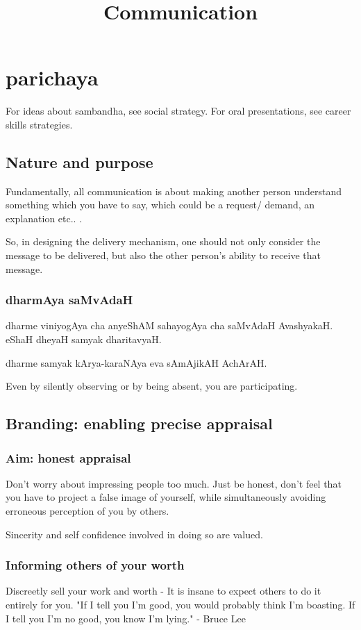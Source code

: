 \documentclass[oneside, article]{memoir}
\title{Communication}
\author{}
\begin{document}
\maketitle

\part{parichaya}
For ideas about sambandha, see social strategy. For oral presentations, see career skills strategies.

\chapter{Nature and purpose}
Fundamentally, all communication is about making another person understand something which you have to say, which could be a request/ demand, an explanation etc.. .

So, in designing the delivery mechanism, one should not only consider the message to be delivered, but also the other person’s ability to receive that message.

\section{dharmAya saMvAdaH}
dharme viniyogAya cha anyeShAM sahayogAya cha saMvAdaH AvashyakaH. eShaH dheyaH samyak dharitavyaH.

dharme samyak kArya-karaNAya eva sAmAjikAH AchArAH.

Even by silently observing or by being absent, you are participating.

\chapter{Branding: enabling precise appraisal}
\section{Aim: honest appraisal}
Don't worry about impressing people too much. Just be honest, don't feel that you have to project a false image of yourself, while simultaneously avoiding erroneous perception of you by others.

Sincerity and self confidence involved in doing so are valued.

\section{Informing others of your worth}
Discreetly sell your work and worth - It is insane to expect others to do it entirely for you. "If I tell you I'm good, you would probably think I'm boasting. If I tell you I'm no good, you know I'm lying." - Bruce Lee
\end{document}
